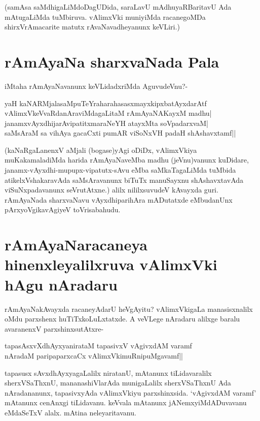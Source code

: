 (samAsa saMdhigaLiMdoDagUDida, saraLavU mAdhuyaRBaritavU Ada mAtugaLiMda tuMbiruva. vAlimxVki muniyiMda racanegoMDa shirxVrAmacarite matutx rAvaNavadheyanunx keVLiri.) 

\section*{rAmAyaNa sharxvaNada Pala} 

iMtaha rAmAyaNavanunx keVLidadxriMda AguvudeVnu?- 

\begin{shloka} 
yaH kaNARMjalasaMpuTeYraharahasasxmayxkipxbatAyxdarAtf\label{152}\\ 
vAlimxVkeVvaRdanAraviMdagaLitaM rAmAyaNAKayxM madhu|\\ 
janamxvAyxdhijarAvipatitxmaraNeYH atayxMta soVpadarxvaM|\\ 
saMsAraM sa vihAya gacaCxti pumAR viSoNxVH padaH shAshavxtamf||
\end{shloka} 

(kaNaRgaLanenxV aMjali (bogase)yAgi oDiDx, vAlimxVkiya muKakamaladiMda harida rAmAyaNaveMba madhu (jeVnu)vanunx kuDidare, janamx-vAyxdhi-mupupx-vipatutx-sAvu eMba saMkaTagaLiMda tuMbida atikelxVshakaravAda saMsAravanunx biTuTx manuSayxnu shAshavxtavAda viSuNxpadavanunx seVrutAtxne.) alilx nililxsuvudeV kAvayxda guri. rAmAyaNada sharxvaNavu vAyxdhiparihAra mADutatxde eMbudanUnx pArxyoVgikavAgiyeV toVrisabahudu. 

\section*{rAmAyaNaracaneya hinenxleyalilxruva vAlimxVki hAgu nAradaru} 

rAmAyaNakAvayxda racaneyAdarU heVgAyitu? vAlimxVkigaLa manasisxnalilx oMdu parxshenx huTiTxkoLuLxtatxde. A veVLege nAradaru alilxge baralu avaranenxV parxshinxsutAtxre- 

\begin{shloka} 
tapasAsxvXdhAyxyanirataM tapasivxV vAgivxdAM varamf\label{153}\\ 
nAradaM paripaparxcaCx vAlimxVkimuRnipuMgavamf||
\end{shloka} 

tapasusx sAvxdhAyxyagaLalilx niratanU, mAtanunx tiLidavaralilx sherxVSaThxnU, mananashiVlarAda munigaLalilx sherxVSaThxnU Ada nAradananunx, tapasivxyAda vAlimxVkiyu parxshinxsida. `vAgivxdAM varamf' mAtanunx cenAnxgi tiLidavanu. keVvala mAtanunx jANemxyiMdADuvavanu eMdaSeTxV alalx. mAtina neleyaritavanu. 

